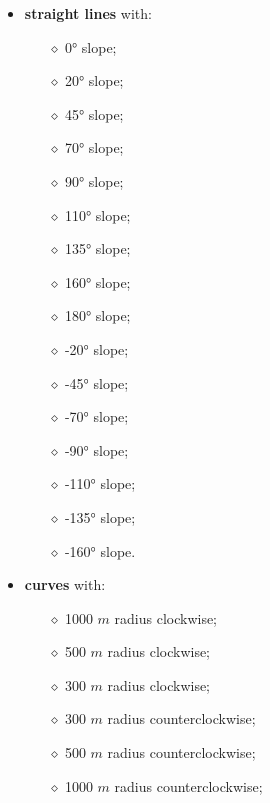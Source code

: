 \begin{itemize}
    \item \textbf{straight lines} with:\begin{multicols}{2} \begin{itemize}
        \item[$\diamond$] 0° slope;
        \item[$\diamond$] 20° slope;
        \item[$\diamond$] 45° slope;
        \item[$\diamond$] 70° slope;
        \item[$\diamond$] 90° slope;
        \item[$\diamond$] 110° slope;
        \item[$\diamond$] 135° slope;
        \item[$\diamond$] 160° slope;
        \item[$\diamond$] 180° slope;
        \item[$\diamond$] -20° slope;
        \item[$\diamond$] -45° slope;
        \item[$\diamond$] -70° slope;
        \item[$\diamond$] -90° slope;
        \item[$\diamond$] -110° slope;
        \item[$\diamond$] -135° slope;
        \item[$\diamond$] -160° slope.
    \end{itemize}
    \end{multicols}
    
    \item \textbf{curves} with:
    \begin{multicols}{2} \begin{itemize}
        \item[$\diamond$] 1000 $m$ radius clockwise;
        \item[$\diamond$] 500 $m$ radius clockwise;
        \item[$\diamond$] 300 $m$ radius clockwise;
        \item[$\diamond$] 300 $m$ radius counterclockwise;
        \item[$\diamond$] 500 $m$ radius counterclockwise;
        \item[$\diamond$] 1000 $m$ radius counterclockwise;
    \end{itemize}
    \end{multicols}
\end{itemize}

